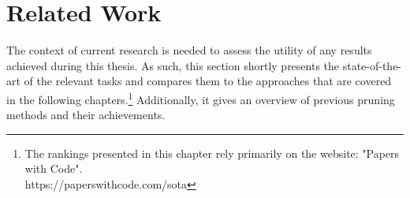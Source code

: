 \chapter{Related Work}
\label{ch:relatedwork}
 The context of current research is needed to assess the utility of any results achieved during this thesis. As such, this section shortly presents the state-of-the-art of the relevant tasks and compares them to the approaches that are covered in the following chapters.\footnote{The rankings presented in this chapter rely primarily on the website: "Papers with Code".\\
 	https://paperswithcode.com/sota
 } Additionally, it gives an overview of previous pruning methods and their achievements. 

